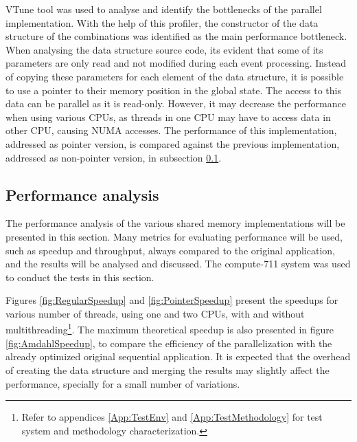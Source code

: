 \intel VTune tool was used to analyse and identify the bottlenecks of the parallel implementation. With the help of this profiler, the constructor of the data structure of the combinations was identified as the main performance bottleneck. When analysing the data structure source code, its evident that some of its parameters are only read and not modified during each event processing. Instead of copying these parameters for each element of the data structure, it is possible to use a pointer to their memory position in the global state. The access to this data can be parallel as it is read-only. However, it may decrease the performance when using various CPUs, as threads in one CPU may have to access data in other CPU, causing NUMA accesses. The performance of this implementation, addressed as pointer version, is compared against the previous implementation, addressed as non-pointer version, in subsection \ref{SharedMemPerformance}.

\subsection{Performance analysis}
\label{SharedMemPerformance}

The performance analysis of the various shared memory implementations will be presented in this section. Many metrics for evaluating performance will be used, such as speedup and throughput, always compared to the original application, and the results will be analysed and discussed. The compute-711 system was used to conduct the tests in this section.

Figures \ref{fig:RegularSpeedup} and \ref{fig:PointerSpeedup} present the speedups for various number of threads, using one and two CPUs, with and without multithreading\footnote{Refer to appendices \ref{App:TestEnv} and \ref{App:TestMethodology} for test system and methodology characterization.}. The maximum theoretical speedup is also presented in figure \ref{fig:AmdahlSpeedup}, to compare the efficiency of the parallelization with the already optimized original sequential application. It is expected that the overhead of creating the data structure and merging the results may slightly affect the performance, specially for a small number of variations.

